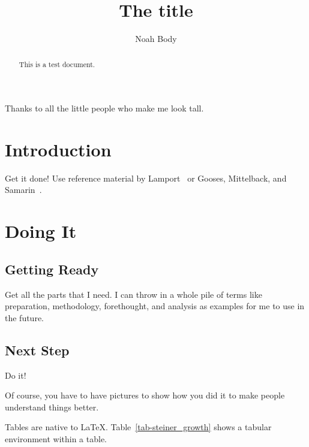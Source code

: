 \documentclass[12pt]{dalcsthesis}
\begin{document}
\mcs  %
\title{The title}
\author{Noah Body}




\nolistoffigures

\frontmatter

\begin{abstract}
This is a test document.
\end{abstract}

\begin{acknowledgements}
Thanks to all the little people who make me look tall.
\end{acknowledgements}

\mainmatter

\chapter{Introduction}

Get it done!  Use reference material by Lamport~\cite{latex-by-lamport} or
Gooses, Mittelback, and Samarin~\cite{latex-companion}.

\chapter{Doing It}

\section{Getting Ready}

Get all the parts that I need.  I can throw in a whole pile of terms like
preparation,
methodology,
forethought,
and
analysis
as examples for me to use in the future.

\section{Next Step}

Do it!

Of course, you have to have pictures to show how you did it to make people
understand things better.

Tables are native to LaTeX.  Table~\ref{tab-steiner_growth} shows a
tabular environment within a table.
\end{document}
